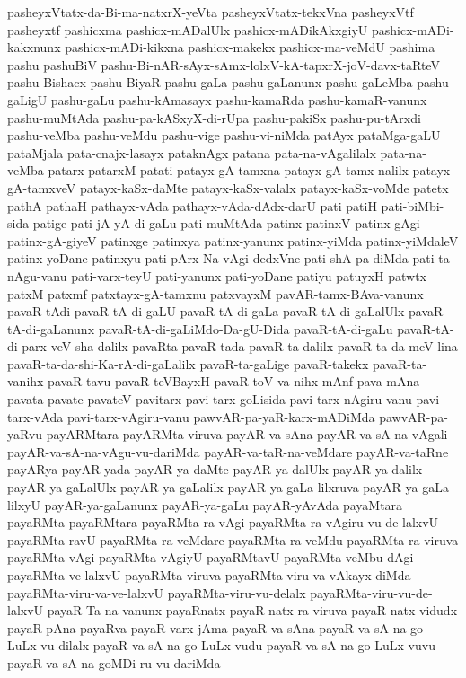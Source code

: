 {pasheyxVtatx-da-Bi-ma-natxrX-yeVta
pasheyxVtatx-tekxVna
pasheyxVtf
pasheyxtf
pashicxma
pashicx-mADalUlx
pashicx-mADikAkxgiyU
pashicx-mADi-kakxnunx
pashicx-mADi-kikxna
pashicx-makekx
pashicx-ma-veMdU
pashima
pashu
pashuBiV
pashu-Bi-nAR-sAyx-sAmx-lolxV-kA-tapxrX-joV-davx-taRteV
pashu-Bishacx
pashu-BiyaR
pashu-gaLa
pashu-gaLanunx
pashu-gaLeMba
pashu-gaLigU
pashu-gaLu
pashu-kAmasayx
pashu-kamaRda
pashu-kamaR-vanunx
pashu-muMtAda
pashu-pa-kASxyX-di-rUpa
pashu-pakiSx
pashu-pu-tArxdi
pashu-veMba
pashu-veMdu
pashu-vige
pashu-vi-niMda
patAyx
pataMga-gaLU
pataMjala
pata-cnajx-lasayx
pataknAgx
patana
pata-na-vAgalilalx
pata-na-veMba
patarx
patarxM
patati
patayx-gA-tamxna
patayx-gA-tamx-nalilx
patayx-gA-tamxveV
patayx-kaSx-daMte
patayx-kaSx-valalx
patayx-kaSx-voMde
patetx
pathA
pathaH
pathayx-vAda
pathayx-vAda-dAdx-darU
pati
patiH
pati-biMbi-sida
patige
pati-jA-yA-di-gaLu
pati-muMtAda
patinx
patinxV
patinx-gAgi
patinx-gA-giyeV
patinxge
patinxya
patinx-yanunx
patinx-yiMda
patinx-yiMdaleV
patinx-yoDane
patinxyu
pati-pArx-Na-vAgi-dedxVne
pati-shA-pa-diMda
pati-ta-nAgu-vanu
pati-varx-teyU
pati-yanunx
pati-yoDane
patiyu
patuyxH
patwtx
patxM
patxmf
patxtayx-gA-tamxnu
patxvayxM
pavAR-tamx-BAva-vanunx
pavaR-tAdi
pavaR-tA-di-gaLU
pavaR-tA-di-gaLa
pavaR-tA-di-gaLalUlx
pavaR-tA-di-gaLanunx
pavaR-tA-di-gaLiMdo-Da-gU-Dida
pavaR-tA-di-gaLu
pavaR-tA-di-parx-veV-sha-dalilx
pavaRta
pavaR-tada
pavaR-ta-dalilx
pavaR-ta-da-meV-lina
pavaR-ta-da-shi-Ka-rA-di-gaLalilx
pavaR-ta-gaLige
pavaR-takekx
pavaR-ta-vanihx
pavaR-tavu
pavaR-teVBayxH
pavaR-toV-va-nihx-mAnf
pava-mAna
pavata
pavate
pavateV
pavitarx
pavi-tarx-goLisida
pavi-tarx-nAgiru-vanu
pavi-tarx-vAda
pavi-tarx-vAgiru-vanu
pawvAR-pa-yaR-karx-mADiMda
pawvAR-pa-yaRvu
payARMtara
payARMta-viruva
payAR-va-sAna
payAR-va-sA-na-vAgali
payAR-va-sA-na-vAgu-vu-dariMda
payAR-va-taR-na-veMdare
payAR-va-taRne
payARya
payAR-yada
payAR-ya-daMte
payAR-ya-dalUlx
payAR-ya-dalilx
payAR-ya-gaLalUlx
payAR-ya-gaLalilx
payAR-ya-gaLa-lilxruva
payAR-ya-gaLa-lilxyU
payAR-ya-gaLanunx
payAR-ya-gaLu
payAR-yAvAda
payaMtara
payaRMta
payaRMtara
payaRMta-ra-vAgi
payaRMta-ra-vAgiru-vu-de-lalxvU
payaRMta-ravU
payaRMta-ra-veMdare
payaRMta-ra-veMdu
payaRMta-ra-viruva
payaRMta-vAgi
payaRMta-vAgiyU
payaRMtavU
payaRMta-veMbu-dAgi
payaRMta-ve-lalxvU
payaRMta-viruva
payaRMta-viru-va-vAkayx-diMda
payaRMta-viru-va-ve-lalxvU
payaRMta-viru-vu-delalx
payaRMta-viru-vu-de-lalxvU
payaR-Ta-na-vanunx
payaRnatx
payaR-natx-ra-viruva
payaR-natx-vidudx
payaR-pAna
payaRva
payaR-varx-jAma
payaR-va-sAna
payaR-va-sA-na-go-LuLx-vu-dilalx
payaR-va-sA-na-go-LuLx-vudu
payaR-va-sA-na-go-LuLx-vuvu
payaR-va-sA-na-goMDi-ru-vu-dariMda
}
